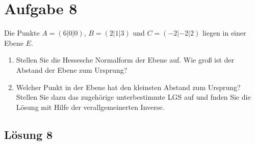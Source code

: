\documentclass[main.tex]{subfiles}
\begin{document}
\section{Aufgabe 8}
Die Punkte $A=(6|0|0)$, $B=(2|1|3)$ und $C=(-2|-2|2)$ liegen in einer Ebene $E$.
\begin{enumerate}
	\item Stellen Sie die Hessesche Normalform der Ebene auf. Wie groß ist der Abstand der Ebene zum Ursprung?
	\item Welcher Punkt in der Ebene hat den kleinsten Abstand zum Ursprung? Stellen Sie dazu das zugehörige unterbestimmte LGS auf und fnden Sie die Lösung mit Hilfe der verallgemeinerten Inverse.
\end{enumerate}

\subsection{Lösung 8}
\end{document}
